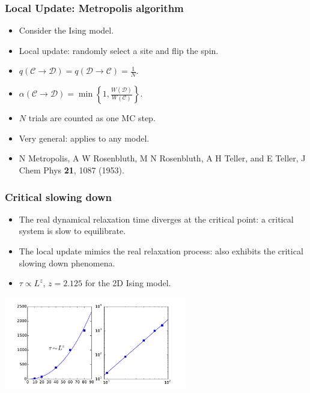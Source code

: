 \documentclass[xcolor=table, 10pt, aspectratio=169, ignorenonframetext]{beamer}
\begin{document}
\begin{frame}
  \frametitle{Local Update: Metropolis algorithm}
  \begin{center}
  \end{center}
  \begin{itemize}
    \item Consider the Ising model.
    \item Local update: randomly select a site and flip the spin.
    \item $q(\mathcal C\rightarrow\mathcal D) = q(\mathcal D\rightarrow\mathcal C) = \frac1N$.
    \item $\alpha(\mathcal C\rightarrow\mathcal D)=\min\left\{1,\frac{W(\mathcal D)}{W(\mathcal C)}\right\}.$
    \item $N$ trials are counted as one MC step.
    \item Very general: applies to any model.
    \item N Metropolis, A W Rosenbluth, M N Rosenbluth, A H Teller, and E Teller, J Chem Phys \textbf{21}, 1087 (1953).
  \end{itemize}
\end{frame}

\begin{frame}
  \frametitle{Critical slowing down}
  \begin{itemize}
    \item The real dynamical relaxation time diverges at the critical point: a critical system is slow to equilibrate.
    \item The local update mimics the real relaxation process: also exhibits the critical slowing down phenomena.
    \item $\tau\propto L^z$, $z=2.125$ for the 2D Ising model.
  \end{itemize}
  \begin{center}
    \includegraphics[width=8cm]{../slmctut/slowdown}
  \end{center}
\end{frame}
\end{document}
